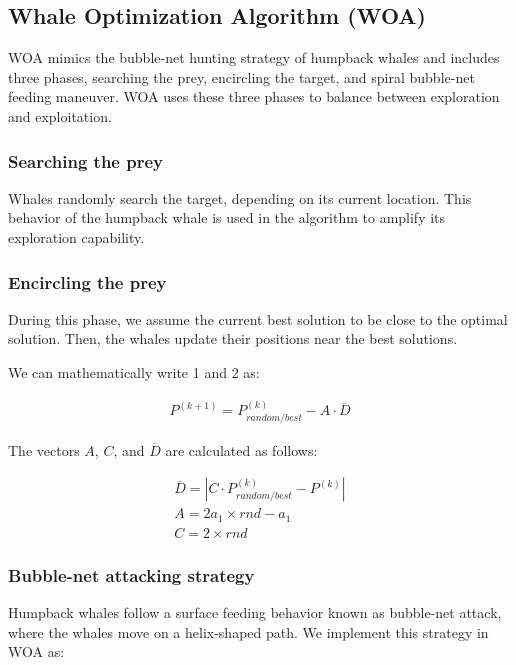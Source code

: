 \documentclass[conference]{IEEEtran}
\begin{document}
\subsection{Whale Optimization Algorithm (WOA)}

WOA mimics the bubble-net hunting strategy of humpback whales and includes three phases, searching the prey, encircling the target, and spiral bubble-net feeding maneuver. 
WOA uses these three phases to balance be­tween exploration and exploitation.

\subsubsection{Searching the prey}

Whales randomly search the target, depending on its current location. 
This behavior of the humpback whale is used in the algorithm to amplify its exploration capability.

\subsubsection{Encircling the prey}

During this phase, we assume the current best solution to be close to the optimal solution. 
Then, the whales update their positions near the best solutions.

We can mathematically write 1 and 2 as:

\setlength{\arraycolsep}{0em}
\begin{eqnarray}
    P^{(k+1)}=P^{(k)}_{random/best}-A\cdot \overline{D}
\end{eqnarray}
\setlength{\arraycolsep}{0pt}

The vectors $A$, $C$, and $\overline{D}$ are calculated as follows:

\setlength{\arraycolsep}{0em}
\begin{eqnarray}
    \overline{D}=| C\cdot P^{(k)}_{random/best}-P^{(k)}| \\
    A = 2a_1 \times rnd - a_1 \\
    C = 2 \times rnd
\end{eqnarray}
\setlength{\arraycolsep}{0pt}

\subsubsection{Bubble-net attacking strategy}

Humpback whales follow a surface feeding behavior known as bubble-net attack, where the whales move on a helix-shaped path. 
We implement this strategy in WOA as:
\end{document}
